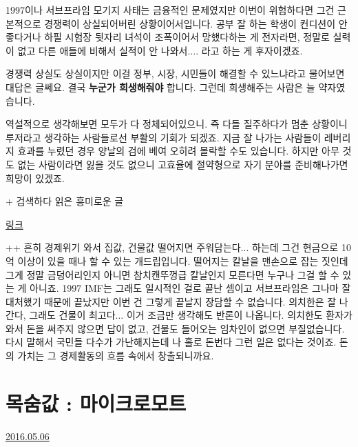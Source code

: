 1997이나 서브프라임 모기지 사태는 금융적인 문제였지만
이번이 위험하다면 그건 근본적으로 경쟁력이 상실되어버린 상황이어서입니다.
공부 잘 하는 학생이 컨디션이 안 좋다거나 하필 시험장 뒷자리 녀석이 조폭이어서 망했다하는 게 전자라면,
정말로 실력이 없고 다른 애들에 비해서 실적이 안 나와서.... 라고 하는 게 후자이겠죠.
\vspace{5mm}

경쟁력 상실도 상실이지만 이걸 정부, 시장, 시민들이 해결할 수 있느냐라고 물어보면 대답은 글쎄요.
결국 \textbf{누군가 희생해줘야} 합니다. 그런데 희생해주는 사람은 늘 약자였습니다.
\vspace{5mm}

역설적으로 생각해보면 모두가 다 정체되어있으니. 즉 다들 질주하다가 멈춘 상황이니 루저라고 생각하는 사람들로선 부활의 기회가 되겠죠.
지금 잘 나가는 사람들이 레버리지 효과를 누렸던 경우 양날의 검에 베여 오히려 몰락할 수도 있습니다.
하지만 아무 것도 없는 사람이라면 잃을 것도 없으니 고효율에 절약형으로 자기 분야를 준비해나가면 희망이 있겠죠.
\vspace{5mm}

+ 검색하다 읽은 흥미로운 글
\vspace{5mm}

\href{https://vivitelaeti.wordpress.com/2016/01/24/%EC%9D%B4%EC%8A%88$-$%EB%B8%8C%EB%A6%AC%ED%95%91$-$17$-$%EC%A0%9C2%EC%9D%98$-$imf%EB%A5%BC$-$%EC%A4%80%EB%B9%84%ED%95%98%EB%A9%B0$-$%ED%98%84%EA%B8%88$-$%EB%8A%98%EB%A6%AC%EB%8A%94$-$%EC%82%AC%EB%9E%8C%EB%93%A4/}{링크}
\vspace{5mm}

++ 흔히 경제위기 와서 집값, 건물값 떨어지면 주워담는다... 하는데 그건 현금으로 10억 이상이 있을 때나 할 수 있는 개드립입니다.
떨어지는 칼날을 맨손으로 잡는 짓인데 그게 정말 금덩어리인지 아니면 참치캔뚜껑급 칼날인지 모른다면 누구나 그걸 할 수 있는 게 아니죠.
1997 IMF는 그래도 일시적인 걸로 끝난 셈이고 서브프라임은 그나마 잘 대처했기 때문에 끝났지만 이번 건 그렇게 끝날지 장담할 수 없습니다.
의치한은 잘 나간다, 그래도 건물이 최고다... 이거 조금만 생각해도 반론이 나옵니다.
의치한도 환자가 와서 돈을 써주지 않으면 답이 없고, 건물도 들어오는 임차인이 없으면 부질없습니다.
다시 말해서 국민들 다수가 가난해지는데 나 홀로 돈번다 그런 일은 없다는 것이죠. 돈의 가치는 그 경제활동의 흐름 속에서 창출되니까요.
\vspace{5mm}





\section{목숨값 : 마이크로모트}
\href{https://www.kockoc.com/Apoc/763162}{2016.05.06}

